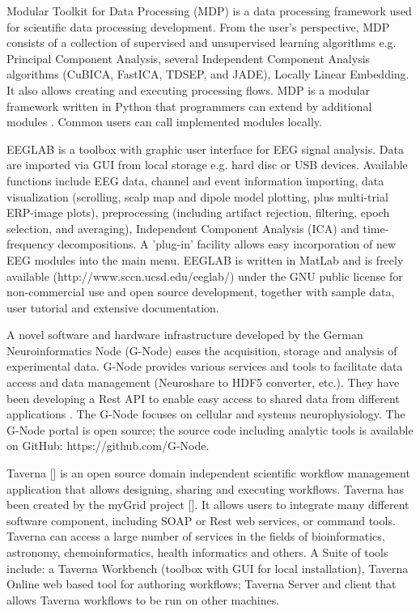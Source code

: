 \documentclass{frontiersSCNS} %
\begin{document}
Modular Toolkit for Data Processing (MDP) \cite{Zito08} is a data processing framework used for scientific data processing development. From the user’s perspective, MDP consists of a collection of supervised and unsupervised learning algorithms e.g. Principal Component Analysis, several Independent Component Analysis algorithms (CuBICA, FastICA, TDSEP, and JADE), Locally Linear Embedding. It also allows creating and executing processing flows. MDP is a modular framework written in Python that programmers can extend by additional modules \cite{MDP12}. Common users can call implemented modules locally.

EEGLAB \cite{Delorme04} is a toolbox with graphic user interface for EEG signal analysis. Data are imported via GUI from local storage e.g. hard disc or USB devices. Available functions include EEG data, channel and event information importing, data visualization (scrolling, scalp map and dipole model plotting, plus multi-trial ERP-image plots), preprocessing (including artifact rejection, filtering, epoch selection, and averaging), Independent Component Analysis (ICA) and time-frequency decompositions. A 'plug-in' facility allows easy incorporation of new EEG modules into the main menu. EEGLAB is written in MatLab and is freely available (http://www.sccn.ucsd.edu/eeglab/) under the GNU public license for non-commercial use and open source development, together with sample data, user tutorial and extensive documentation.

A novel software and hardware infrastructure developed by the German Neuroinformatics Node (G-Node) \cite{Herz08, GNode} eases the acquisition, storage and analysis of experimental data. G-Node provides various services and tools to facilitate data access and data management (Neuroshare \cite{Neuroshare} to HDF5 converter, etc.). They have been developing a Rest API to enable easy access to shared data from different applications \cite{Sobolev14}. The G-Node focuses on cellular and systems neurophysiology. The G-Node portal is open source; the source code including analytic tools is available on GitHub: https://github.com/G-Node.

Taverna [] is an open source domain independent scientific workflow management application that allows designing, sharing and executing workflows. Taverna has been created by the myGrid project []. It allows users to integrate many different software component, including SOAP or Rest web services, or command tools. Taverna can access a large number of services in the fields of bioinformatics, astronomy, chemoinformatics, health informatics and others. A Suite of tools include: a Taverna Workbench (toolbox with GUI for local installation), Taverna Online web based tool for authoring workflows; Taverna Server and client that allows Taverna workflows to be run on other machines.
\end{document}

